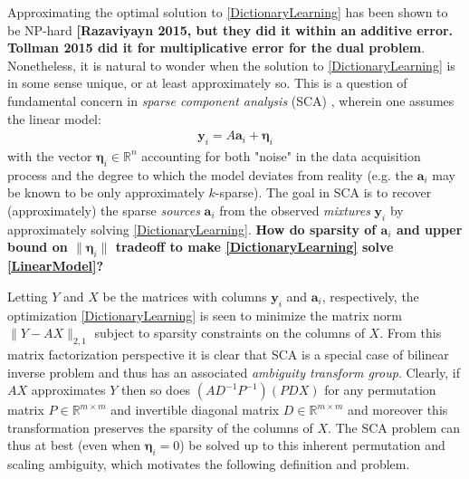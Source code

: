 \documentclass[journal, onecolumn]{IEEEtran}
\begin{document}
Approximating the optimal solution to \eqref{DictionaryLearning} has been shown to be NP-hard \cite{Razaviyayn} \textbf{[Razaviyayn 2015, but they did it within an additive error. Tollman 2015 did it for multiplicative error for the dual problem}. Nonetheless, it is natural to wonder when the solution to \eqref{DictionaryLearning} is in some sense unique, or at least approximately so. This is a question of fundamental concern in \emph{sparse component analysis} (SCA) \cite{Georgiev05}, wherein one assumes the linear model:
\begin{align}\label{LinearModel}
\mathbf{y}_i = A\mathbf{a}_i + \mathbf{\eta}_i 
\end{align}
%
with the vector $\mathbf{\eta}_i \in \mathbb{R}^n$ accounting for both "noise" in the data acquisition process and the degree to which the model deviates from reality (e.g. the $\mathbf{a}_i$ may be known to be only approximately $k$-sparse). The goal in SCA is to recover (approximately) the sparse \emph{sources} $\mathbf{a}_i$ from the observed \emph{mixtures} $\mathbf{y}_i$ by approximately solving \eqref{DictionaryLearning}. \textbf{How do sparsity of $\mathbf{a}_i$ and upper bound on $\|\mathbf{\eta}_i\|$ tradeoff to make \eqref{DictionaryLearning} solve \eqref{LinearModel}?}


Letting $Y$ and $X$ be the matrices with columns $\mathbf{y}_i$ and $\mathbf{a}_i$, respectively, the optimization \eqref{DictionaryLearning} is seen to minimize the matrix norm $\|Y-AX\|_{2,1}$ subject to sparsity constraints on the columns of $X$. From this matrix factorization perspective it is clear that SCA is a special case of bilinear inverse problem and thus has an associated \emph{ambiguity transform group}. Clearly, if $AX$ approximates $Y$ then so does $(AD^{-1}P^{-1})(PDX)$ for any permutation matrix $P \in \mathbb{R}^{m \times m}$ and invertible diagonal matrix $D \in \mathbb{R}^{m \times m}$ and moreover this transformation preserves the sparsity of the columns of $X$. The SCA problem can thus at best (even when $\mathbf{\eta}_i = 0$) be solved up to this inherent permutation and scaling ambiguity, which motivates the following definition and problem.
\end{document}
